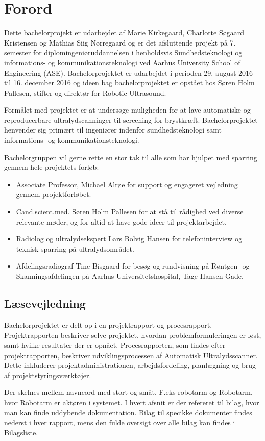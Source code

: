 \chapter{Forord}
Dette bachelorprojekt er udarbejdet af Marie Kirkegaard, Charlotte Søgaard Kristensen og Mathias Siig Nørregaard og er det afsluttende projekt på 7. semester for diplomingeniøruddannelsen i henholdsvis Sundhedsteknologi og informations- og kommunikationsteknologi ved Aarhus University School of Engineering (ASE). Bachelorprojektet er udarbejdet i perioden 29. august 2016 til 16. december 2016 og ideen bag bachelorprojektet er opstået hos Søren Holm Pallesen, stifter og direktør for Robotic Ultrasound. 

Formålet med projektet er at undersøge muligheden for at lave automatiske og reproducerbare ultralydscanninger til screening for brystkræft. Bachelorprojektet henvender sig primært til ingeniører indenfor sundhedsteknologi samt informations- og  kommunikationsteknologi. 

Bachelorgruppen vil gerne rette en stor tak til alle som har hjulpet med sparring gennem hele projektets forløb:

\let\labelitemi\labelitemii
\begin{itemize}
\item Associate Professor, Michael Alrøe for support og engageret vejledning gennem projektforløbet.

\item Cand.scient.med. Søren Holm Pallesen for at stå til rådighed ved diverse relevante møder, og for altid at have gode ideer til projektarbejdet.

\item Radiolog og ultralydsekspert Lars Bolvig Hansen for telefoninterview og teknisk sparring på ultralydsområdet.

\item Afdelingsradiograf Tine Bisgaard for besøg og rundvisning på Røntgen- og Skanningsafdelingen på Aarhus Universitetshospital, Tage Hansen Gade. 
\end{itemize}

\section{Læsevejledning} 
Bachelorprojektet er delt op i en projektrapport og procesrapport. Projektrapporten beskriver selve projektet, hvordan problemformuleringen er løst, samt hvilke resultater der er opnået. Procesrapporten, som findes efter projektrapporten, beskriver udviklingsprocessen af Automatisk Ultralydsscanner. Dette inkluderer projektadministrationen, arbejdsfordeling, planlægning og brug af projektstyringsværktøjer. 

Der skelnes mellem navneord med stort og småt. F.eks robotarm og Robotarm, hvor Robotarm er aktøren i systemet.
I hvert afsnit er der refereret til bilag, hvor man kan finde uddybende dokumentation. Bilag til specikke dokumenter findes nederst i hver rapport, mens den fulde oversigt over alle bilag kan findes i Bilagsliste.  
